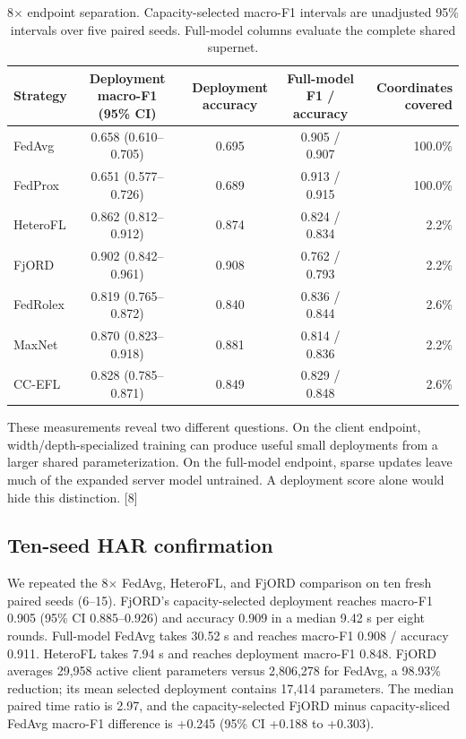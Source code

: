 \documentclass[conference]{IEEEtran}
\begin{document}
\begin{table}[t]
\caption{8$\times$ endpoint separation. Capacity-selected macro-F1 intervals are unadjusted 95\% intervals over five paired seeds. Full-model columns evaluate the complete shared supernet.}
\label{tab:full}
\centering
\footnotesize
\begin{tabular}{@{}lccc r@{}}
\toprule
Strategy & Deployment macro-F1 (95\% CI) & Deployment accuracy & Full-model F1 / accuracy & Coordinates covered \\
\midrule
FedAvg & 0.658 (0.610--0.705) & 0.695 & 0.905 / 0.907 & 100.0\% \\
FedProx & 0.651 (0.577--0.726) & 0.689 & 0.913 / 0.915 & 100.0\% \\
HeteroFL & 0.862 (0.812--0.912) & 0.874 & 0.824 / 0.834 & 2.2\% \\
FjORD & 0.902 (0.842--0.961) & 0.908 & 0.762 / 0.793 & 2.2\% \\
FedRolex & 0.819 (0.765--0.872) & 0.840 & 0.836 / 0.844 & 2.6\% \\
MaxNet & 0.870 (0.823--0.918) & 0.881 & 0.814 / 0.836 & 2.2\% \\
CC-EFL & 0.828 (0.785--0.871) & 0.849 & 0.829 / 0.848 & 2.6\% \\
\bottomrule
\end{tabular}
\end{table}

These measurements reveal two different questions. On the client endpoint, width/depth-specialized training can produce useful small deployments from a larger shared parameterization. On the full-model endpoint, sparse updates leave much of the expanded server model untrained. A deployment score alone would hide this distinction. [8]

\subsection{Ten-seed HAR confirmation}
We repeated the 8$\times$ FedAvg, HeteroFL, and FjORD comparison on ten fresh paired seeds (6--15). FjORD's capacity-selected deployment reaches macro-F1 0.905 (95\% CI 0.885--0.926) and accuracy 0.909 in a median 9.42 s per eight rounds. Full-model FedAvg takes 30.52 s and reaches macro-F1 0.908 / accuracy 0.911. HeteroFL takes 7.94 s and reaches deployment macro-F1 0.848. FjORD averages 29,958 active client parameters versus 2,806,278 for FedAvg, a 98.93\% reduction; its mean selected deployment contains 17,414 parameters. The median paired time ratio is 2.97, and the capacity-selected FjORD minus capacity-sliced FedAvg macro-F1 difference is +0.245 (95\% CI +0.188 to +0.303).
\end{document}
